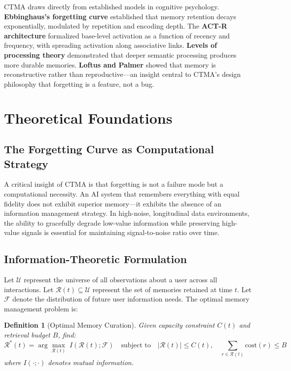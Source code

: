 \documentclass[11pt,a4paper]{article}
\newtheorem{definition}{Definition}
\begin{document}
CTMA draws directly from established models in cognitive psychology. \textbf{Ebbinghaus's forgetting curve} \citep{ebbinghaus1885memory} established that memory retention decays exponentially, modulated by repetition and encoding depth. The \textbf{ACT-R architecture} \citep{anderson1991reflections, anderson2004integrated} formalized base-level activation as a function of recency and frequency, with spreading activation along associative links. \textbf{Levels of processing theory} \citep{craik1972levels} demonstrated that deeper semantic processing produces more durable memories. \textbf{Loftus and Palmer} \citep{loftus1974reconstruction} showed that memory is reconstructive rather than reproductive---an insight central to CTMA's design philosophy that forgetting is a feature, not a bug.


\section{Theoretical Foundations}
\label{sec:theory}

\subsection{The Forgetting Curve as Computational Strategy}

A critical insight of CTMA is that forgetting is not a failure mode but a computational necessity. An AI system that remembers everything with equal fidelity does not exhibit superior memory---it exhibits the absence of an information management strategy. In high-noise, longitudinal data environments, the ability to gracefully degrade low-value information while preserving high-value signals is essential for maintaining signal-to-noise ratio over time.

\subsection{Information-Theoretic Formulation}

Let $\mathcal{U}$ represent the universe of all observations about a user across all interactions. Let $\mathcal{R}(t) \subseteq \mathcal{U}$ represent the set of memories retained at time $t$. Let $\mathcal{F}$ denote the distribution of future user information needs. The optimal memory management problem is:

\begin{definition}[Optimal Memory Curation]
\label{def:optimal_memory}
Given capacity constraint $C(t)$ and retrieval budget $B$, find:
\begin{equation}
\mathcal{R}^*(t) = \arg\max_{\mathcal{R}(t)} \; I(\mathcal{R}(t); \mathcal{F}) \quad \text{subject to} \quad |\mathcal{R}(t)| \leq C(t), \quad \sum_{r \in \mathcal{R}(t)} \text{cost}(r) \leq B
\label{eq:optimization}
\end{equation}
where $I(\cdot; \cdot)$ denotes mutual information.
\end{definition}
\end{document}
